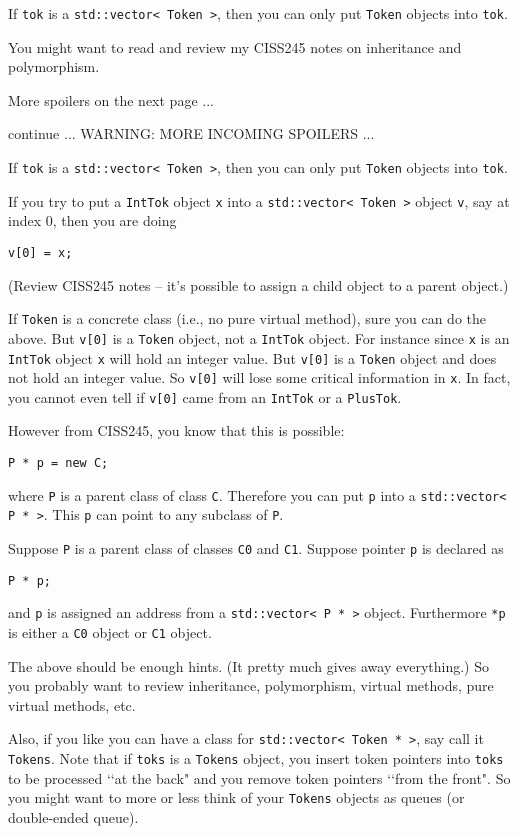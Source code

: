 If \verb!tok! is a \verb!std::vector< Token >!, then you can only put
\verb!Token! objects into \verb!tok!.

You might want to read and review my CISS245 notes on inheritance and polymorphism.

More spoilers on the next page ...

\newpage
continue ... WARNING: MORE INCOMING SPOILERS ...

If \verb!tok! is a \verb!std::vector< Token >!, then you can only put
\verb!Token! objects into \verb!tok!.

If you try to put a \verb!IntTok! object \verb!x!
into a \verb!std::vector< Token >!
object \verb!v!, say at index 0, then you are doing
\begin{Verbatim}[frame=single,fontsize=\footnotesize]
v[0] = x;
\end{Verbatim}
(Review CISS245 notes -- it's possible to assign a child object to a
parent object.)

If \verb!Token! is a concrete class (i.e., no pure virtual method),
sure you can do the above.
But \verb!v[0]! is a \verb!Token! object, not a \verb!IntTok! object.
For instance since \verb!x! is an \verb!IntTok! object \verb!x! will
hold an integer value.
But \verb!v[0]! is a \verb!Token! object and does not hold an
integer value.
So \verb!v[0]! will lose some critical information in \verb!x!.
In fact, you cannot even tell if
\verb!v[0]! came from an \verb!IntTok! or a \verb!PlusTok!.

However from CISS245, you know that this is possible:
\begin{Verbatim}[frame=single,fontsize=\footnotesize]
P * p = new C;
\end{Verbatim}
where \verb!P! is a parent class of class \verb!C!.
Therefore you can put \verb!p! into a \verb!std::vector< P * >!.
This \verb!p! can point to any subclass of \verb!P!.

Suppose \verb!P! is a parent class of classes \verb!C0! and \verb!C1!.
Suppose pointer \verb!p! is declared as
\begin{Verbatim}[frame=single,fontsize=\footnotesize]
P * p;
\end{Verbatim}
and \verb!p! is assigned an address from a \verb!std::vector< P * >! object.
Furthermore \verb!*p! is either a
\verb!C0! object or \verb!C1! object.

The above should be enough hints. (It pretty much gives away everything.)
So you probably want to review inheritance, polymorphism, virtual methods,
pure virtual methods, etc.

Also, if you like you can have a class for \verb!std::vector< Token * >!,
say call it \verb!Tokens!.
Note that if \verb!toks! is a \verb!Tokens! object,
you insert token pointers into \verb!toks!
to be processed \lq\lq at the back"
and you remove token pointers \lq\lq from the front".
So you might want to more or less think of your \verb!Tokens! objects
as queues (or double-ended queue).
